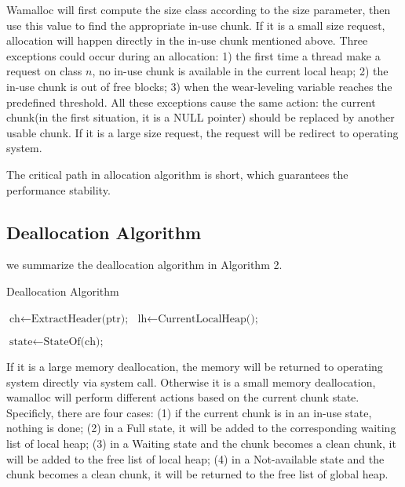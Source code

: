 \documentclass{vldb}
\begin{document}
Wamalloc will first compute the size class according to the size parameter, 
then use this value to find the appropriate in-use chunk.
If it is a small size request, allocation will happen directly in the in-use chunk mentioned above.
Three exceptions could occur during an allocation:
1) the first time a thread make a request on class $n$, no in-use chunk is available in the current local heap;
2) the in-use chunk is out of free blocks;
3) when the wear-leveling variable reaches the predefined threshold.
All these exceptions cause the same action: the current chunk(in the first situation, it is a NULL pointer) should be replaced by another usable chunk.
If it is a large size request, the request will be redirect to operating system.

The critical path in allocation algorithm is short, which guarantees the performance stability.

\subsection{Deallocation Algorithm}

we summarize the deallocation algorithm in Algorithm 2.

\begin{algorithm}
\caption{Deallocation Algorithm}\label{euclid}
\begin{algorithmic}[1]

\State $\text{ch} \gets \text{ExtractHeader(ptr);}$
\State $\text{lh} \gets \text{CurrentLocalHeap();}$

\State {}
\Else
\State {}
\State $\text{state} \gets \text{StateOf(ch);}$

    \State {}
    \State {}
        \State {}
    \EndIf
{}
        \State {}
    \EndIf
\Else
    \State {}
\EndIf
\EndIf

\EndProcedure
\end{algorithmic}
\end{algorithm}

If it is a large memory deallocation, the memory will be returned to operating system directly via system call.
Otherwise it is a small memory deallocation, wamalloc will perform different actions based on the current chunk state.
Specificly, there are four cases:
(1) if the current chunk is in an in-use state, nothing is done;
(2) in a Full state, it will be added to the corresponding waiting list of local heap;
(3) in a Waiting state and the chunk becomes a clean chunk, it will be added to the free list of local heap;
(4) in a Not-available state and the chunk becomes a clean chunk, it will be returned to the free list of global heap.
\end{document}

